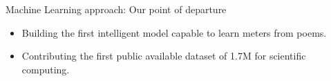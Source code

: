 \begin{frame}[fragile]{Machine Learning approach: Our point of departure}
\begin{itemize}
\item <1-> Building the first intelligent model capable to learn meters from poems.
\item <2-> Contributing the first public available dataset of 1.7M for scientific computing.
%
%
%	
%	
\end{itemize}
\end{frame}

